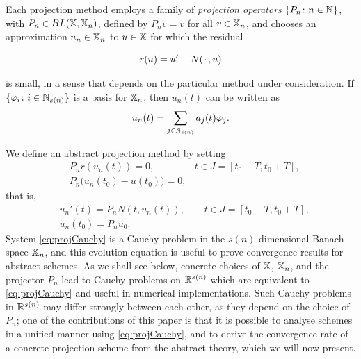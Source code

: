 \documentclass[a4paper,baskervaldx]{daarticle}
\renewcommand{\phi}{\varphi}
\newcommand{\rev}[1]{#1}
\newcommand{\linelabel}[1]{}
\begin{document}
Each projection method employs a family of \emph{projection
operators}
$\{ P_n \colon n \in \mathbb{N}\}$, with $P_n \in BL(\mathbb{X},\mathbb{X}_n)$, defined by
$P_n v = v$ for all $v \in \mathbb{X}_n$, and chooses an approximation $u_n \in \mathbb{X}_n$
to $u \in \mathbb{X}$ for which the residual 
\rev{
  \begin{equation}\label{eq:residualDef}
    r(u) = u' - N({\mkern 2mu\cdot\mkern 2mu},u)
  \end{equation}
}
is small, 
in a sense that depends on the particular method under consideration. 
If $\{ \phi_i \colon i \in \NSet_{s(n)}\}$
is a basis for $\mathbb{X}_n$, then $u_n(t)$ can be written as
\begin{equation}\label{eq:basisDecomp}
  u_n(t) = \sum_{j \in \NSet_{s(n)}} a_j(t) \phi_j.
\end{equation}

\linelabel{line:restructure1}
\rev{
We define an abstract projection method by setting
\[
  \begin{aligned}
    & P_n r(u_n(t)) = 0, & t \in J = [t_0-T,t_0+T], \\
    & P_n \big( u_n(t_0)-u(t_0) \big) = 0, &
  \end{aligned}
\]
that is,
\begin{equation}\label{eq:projCauchy}
  \begin{aligned}
  & u_n'(t) = P_n N(t,u_n(t)), \qquad t \in J \rev{=[t_0-T,t_0+T]}, \\
  & u_n(t_0) = P_n u_0.
  \end{aligned}
\end{equation}
%
System \cref{eq:projCauchy} is a Cauchy problem in the $s(n)$-dimensional Banach
space $\mathbb{X}_n$, and this evolution equation is useful to prove convergence results for abstract
schemes. As we shall see below, concrete choices of $\mathbb{X}$, $\mathbb{X}_n$, and the projector
$P_n$ lead to Cauchy problems on $\mathbb{R}^{s(n)}$ which are equivalent to
\cref{eq:projCauchy} and useful in numerical implementations. Such Cauchy problems in
$\mathbb{R}^{s(n)}$ may differ strongly between each other, as they depend
on the choice of $P_n$; one of the contributions of this paper is that it is possible
to analyse schemes in a unified manner using \cref{eq:projCauchy}, and to derive the convergence rate
of a concrete projection scheme from the abstract theory, which we will now present.
}

\end{document}
